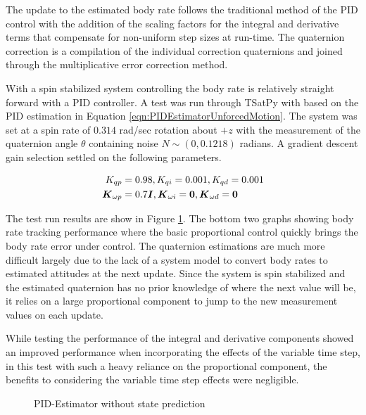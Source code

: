 The update to the estimated body rate follows the traditional method of the PID control with the addition of the scaling factors for the integral and derivative terms that compensate for non-uniform step sizes at run-time.  The quaternion correction is a compilation of the individual correction quaternions and joined through the multiplicative error correction method.

With a spin stabilized system controlling the body rate is relatively straight forward with a PID controller.  A test was run through TSatPy with based on the PID estimation in Equation \ref{eqn:PIDEstimatorUnforcedMotion}.  The system was set at a spin rate of $0.314$ rad/sec rotation about $+z$ with the measurement of the quaternion angle $\theta$ containing noise $N \sim (0, 0.1218)$ radians.  A gradient descent gain selection settled on the following parameters.

\begin{equation}
  \begin{aligned}
    K_{qp} &= 0.98, K_{qi} = 0.001, K_{qd} = 0.001 \\
    \boldsymbol{K}_{\omega p} &= 0.7 \boldsymbol{I}, \boldsymbol{K}_{\omega i} = \boldsymbol{0}, \boldsymbol{K}_{\omega d} = \boldsymbol{0}
  \end{aligned}
\end{equation}

The test run results are show in Figure \ref{fig:PIDEstimatorwithoutstateprediction}.  The bottom two graphs showing body rate tracking performance where the basic proportional control quickly brings the body rate error under control.  The quaternion estimations are much more difficult largely due to the lack of a system model to convert body rates to estimated attitudes at the next update.  Since the system is spin stabilized and the estimated quaternion has no prior knowledge of where the next value will be, it relies on a large proportional component to jump to the new measurement values on each update.

While testing the performance of the integral and derivative components showed an improved performance when incorporating the effects of the variable time step, in this test with such a heavy reliance on the proportional component, the benefits to considering the variable time step effects were negligible.

\begin{figure}[H]
  \centerline{}
  \caption{PID-Estimator without state prediction}
  \label{fig:PIDEstimatorwithoutstateprediction}
\end{figure}

